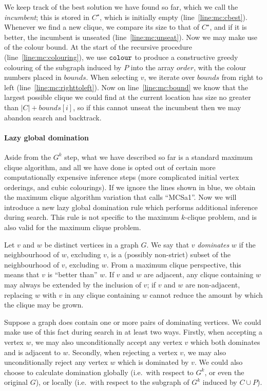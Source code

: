 \documentclass[letterpaper]{article}
\newcommand{\mcline}[1]{line~\ref{line:mc:#1}}
\newcommand{\Cbest}{C^\star}
\newcommand{\bounds}{\mathit{bounds}}
\newcommand{\order}{\mathit{order}}
\newcommand{\colourOrder}{\FuncSty{colour}}
\begin{document}
We keep track of the best solution we have found so far, which we call the \emph{incumbent}; this is
stored in $\Cbest$, which is initially empty (\mcline{cbest}). Whenever we find a new clique, we
compare its size to that of $\Cbest$, and if it is better, the incumbent is unseated
(\mcline{unseat}). Now we may make use of the colour bound. At the start of the recursive procedure
(\mcline{colouring}), we use $\colourOrder$ to produce a constructive greedy colouring of the
subgraph induced by $P$ into the array $\order$, with the colour numbers placed in $\bounds$. When
selecting $v$, we iterate over $\bounds$ from right to left (\mcline{righttoleft}). Now on
\mcline{bound} we know that the largest possible clique we could find at the current location has
size no greater than $|C| + \bounds[i]$, so if this cannot unseat the incumbent then we may abandon
search and backtrack.

\paragraph{Lazy global domination}

Aside from the $G^k$ step, what we have described so far is a standard maximum clique algorithm, and
all we have done is opted out of certain more computationally expensive inference steps (more
complicated initial vertex orderings, and cubic colourings). If we ignore the lines shown in blue,
we obtain the maximum clique algorithm variation that \citeauthor{Prosser:2012}
 calls ``MCSa1''.  Now we will introduce a new lazy global domination rule
which performs additional inference during search. This rule is not specific to the maximum
$k$-clique problem, and is also valid for the maximum clique problem.

Let $v$ and $w$ be distinct vertices in a graph $G$. We say that $v$ \emph{dominates} $w$ if the
neighbourhood of $w$, excluding $v$, is a (possibly non-strict) subset of the neighbourhood of $v$,
excluding $w$. From a maximum clique perspective, this means that $v$ is ``better than'' $w$. If $v$
and $w$ are adjacent, any clique containing $w$ may always be extended by the inclusion of $v$; if
$v$ and $w$ are non-adjacent, replacing $w$ with $v$ in any clique containing $w$ cannot reduce the
amount by which the clique may be grown.

Suppose a graph does contain one or more pairs of dominating vertices. We could make use of this
fact during search in at least two ways. Firstly, when accepting a vertex $w$, we may also
unconditionally accept any vertex $v$ which both dominates and is adjacent to $w$. Secondly, when
rejecting a vertex $v$, we may also unconditionally reject any vertex $w$ which is dominated by $v$.
We could also choose to calculate domination globally (i.e.\ with respect to $G^k$, or even the
original $G$), or locally (i.e.\ with respect to the subgraph of $G^k$ induced by $C \cup P$).
\end{document}
